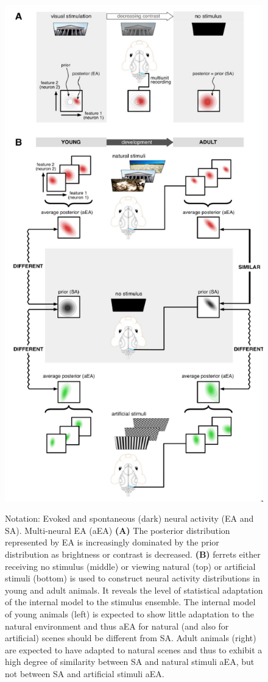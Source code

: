 \documentclass[main]{subfiles}
\begin{document}
\begin{figure}[H]
	\centering
	\includegraphics[width=0.7\linewidth]{07_UnsupervisedAndSelfsupervisedLearning/figures/ferret.png}
	\label{fig:ferret}
	\caption {Notation: Evoked and spontaneous (dark) neural activity (EA and SA). Multi-neural EA (aEA) \textbf{(A)} The posterior distribution represented by EA is increasingly dominated by the prior distribution as brightness or contrast is decreased. \textbf{(B)} ferrets either receiving no stimulus (middle) or viewing natural (top) or artificial stimuli (bottom) is used to construct neural activity distributions in young and adult animals. It reveals the level of statistical adaptation of the internal model to the stimulus ensemble. The internal model of young animals (left) is expected to show little adaptation to the natural environment and thus aEA for natural (and also for artificial) scenes should be different from SA. Adult animals (right) are expected to have adapted to natural scenes and thus to exhibit a high degree of similarity between SA and natural stimuli aEA, but not between SA and artificial stimuli aEA.}
\end{figure}
\end{document}
